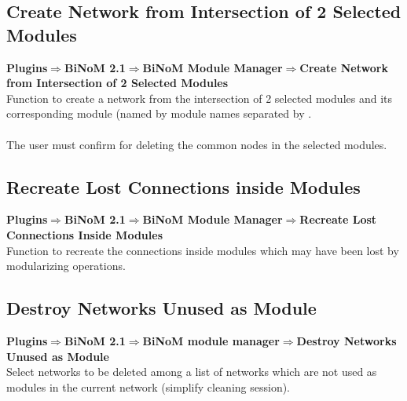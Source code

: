 \subsection{Create Network from Intersection of 2 Selected Modules}
\textbf{Plugins$\Rightarrow$BiNoM 2.1$\Rightarrow$BiNoM Module Manager$\Rightarrow$Create Network from Intersection of 2 Selected Modules}\\
Function to create a network from the intersection of 2 selected modules and its corresponding module (named by module names separated by \textbar.\\\\
The user must confirm for deleting the common nodes in the selected modules.

\subsection{Recreate Lost Connections inside Modules}
\textbf{Plugins$\Rightarrow$BiNoM 2.1$\Rightarrow$BiNoM Module Manager$\Rightarrow$Recreate Lost Connections Inside Modules}\\
Function to recreate the connections inside modules which may have been lost by modularizing operations.

\subsection{Destroy Networks Unused as Module}
\textbf{Plugins$\Rightarrow$BiNoM 2.1$\Rightarrow$BiNoM module manager$\Rightarrow$Destroy Networks Unused as Module}\\
Select networks to be deleted among a list of networks which are not used as modules in the current network (simplify cleaning session).
